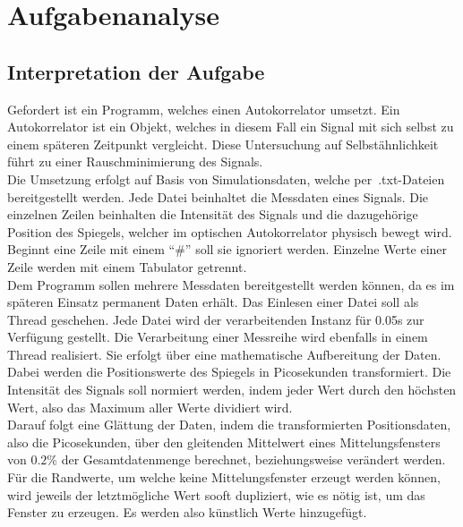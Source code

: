 \chapter{Aufgabenanalyse}\label{ch:aufgabenanalyse}


\section{Interpretation der Aufgabe}\label{sec:interpretation-der-aufgabe}
Gefordert ist ein Programm, welches einen Autokorrelator umsetzt.
Ein Autokorrelator ist ein Objekt, welches in diesem Fall ein Signal mit sich selbst zu einem späteren Zeitpunkt vergleicht.
Diese Untersuchung auf Selbstähnlichkeit führt zu einer Rauschminimierung des Signals.\\

Die Umsetzung erfolgt auf Basis von Simulationsdaten, welche per~.txt-Dateien bereitgestellt werden.
Jede Datei beinhaltet die Messdaten eines Signals.
Die einzelnen Zeilen beinhalten die Intensität des Signals und die dazugehörige Position des Spiegels, welcher im optischen Autokorrelator physisch bewegt wird.\\
Beginnt eine Zeile mit einem \enquote{\#} soll sie ignoriert werden.
Einzelne Werte einer Zeile werden mit einem Tabulator getrennt.\\
Dem Programm sollen mehrere Messdaten bereitgestellt werden können, da es im späteren Einsatz permanent Daten erhält.
Das Einlesen einer Datei soll als Thread geschehen.
Jede Datei wird der verarbeitenden Instanz für 0.05s zur Verfügung gestellt.
Die Verarbeitung einer Messreihe wird ebenfalls in einem Thread realisiert.
Sie erfolgt über eine mathematische Aufbereitung der Daten.
Dabei werden die Positionswerte des Spiegels in Picosekunden transformiert.
Die Intensität des Signals soll normiert werden, indem jeder Wert durch den höchsten Wert, also das Maximum aller Werte dividiert wird.\\

Darauf folgt eine Glättung der Daten, indem die transformierten Positionsdaten, also die Picosekunden, über den gleitenden Mittelwert eines Mittelungsfensters von $0.2\%$ der Gesamtdatenmenge berechnet, beziehungsweise verändert werden.\\
Für die Randwerte, um welche keine Mittelungsfenster erzeugt werden können, wird jeweils der letztmögliche Wert sooft dupliziert, wie es nötig ist, um das Fenster zu erzeugen.
Es werden also künstlich Werte hinzugefügt.\\

